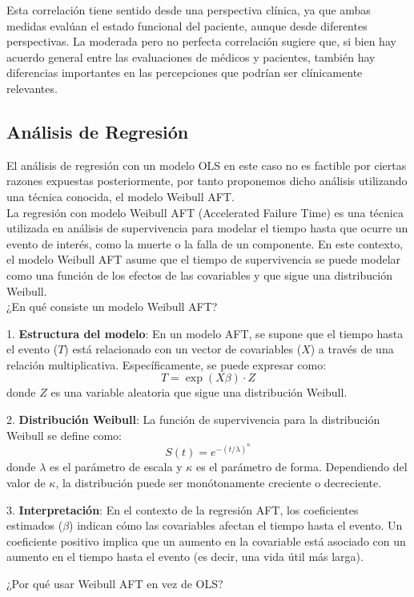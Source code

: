 \documentclass[a4paper,12pt]{article}
\begin{document}
Esta correlación tiene sentido desde una perspectiva clínica, ya que ambas medidas evalúan el estado funcional del paciente, aunque desde diferentes perspectivas. La moderada pero no perfecta correlación sugiere que, si bien hay acuerdo general entre las evaluaciones de médicos y pacientes, también hay diferencias importantes en las percepciones que podrían ser clínicamente relevantes.
\subsection*{Análisis de Regresión}


El análisis de regresión con un modelo OLS en este caso no es factible por ciertas razones expuestas posteriormente, por tanto proponemos dicho análisis utilizando una técnica conocida, el modelo Weibull AFT. \\
La regresión con modelo Weibull AFT (Accelerated Failure Time) es una técnica utilizada en análisis de supervivencia para modelar el tiempo hasta que ocurre un evento de interés, como la muerte o la falla de un componente.
 En este contexto, el modelo Weibull AFT asume que el tiempo de supervivencia se puede modelar como una función de los efectos de las covariables y que sigue una distribución Weibull.\\

¿En qué consiste un modelo Weibull AFT?

1. \textbf{Estructura del modelo}: En un modelo AFT, se supone que el tiempo hasta el evento ($T$) está relacionado con un vector de covariables ($X$) a través de una relación multiplicativa. Específicamente, se puede expresar como:
   \[
   T = \exp(X\beta) \cdot Z
   \]
   donde $Z$ es una variable aleatoria que sigue una distribución Weibull.

2. \textbf{Distribución Weibull}: La función de supervivencia para la distribución Weibull se define como:
   \[
   S(t) = e^{-(t/\lambda)^\kappa}
   \]
   donde $\lambda$ es el parámetro de escala y $\kappa$ es el parámetro de forma. Dependiendo del valor de $\kappa$, la distribución puede ser monótonamente creciente o decreciente.

3. \textbf{Interpretación}: En el contexto de la regresión AFT, los coeficientes estimados ($\beta$) indican cómo las covariables afectan el tiempo hasta el evento. Un coeficiente positivo implica que un aumento en la covariable está asociado con un aumento en el tiempo hasta el evento (es decir, una vida útil más larga).

¿Por qué usar Weibull AFT en vez de OLS?
\end{document}
